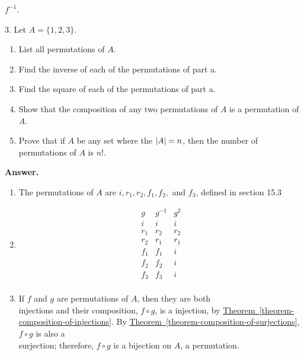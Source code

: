 \documentclass[10pt,]{book}
\theoremstyle{plain}
\theoremstyle{definition}
\theoremstyle{definition}
\theoremstyle{definition}
\begin{document}
\begin{exercisegroup}
\(f^{-1}\).%
\par\smallskip
\item[3.]\hypertarget{exercise-25}{}Let \(A = \{1, 2, 3\}\).%
\par
\leavevmode%
\begin{enumerate}[label=\alph*]
\item\hypertarget{li-78}{} List all permutations of \(A\).%
\item\hypertarget{li-79}{} Find the inverse of each of the permutations of part a.%
\item\hypertarget{li-80}{} Find the square of each of the permutations of part a.%
\item\hypertarget{li-81}{} Show that the composition of any two permutations of \(A\) is a permutation of \( A\).%
\item\hypertarget{li-82}{} Prove that if \(A\) be any set where the \(|A|=\text{\textit{$n$}}\), then the number of permutations of \(A\) is \(n!\).%
\end{enumerate}
%
\par\smallskip
\par\smallskip
\noindent\textbf{Answer.}\hypertarget{answer-12}{}\quad
\leavevmode%
\begin{enumerate}[label=\alph*]
\item\hypertarget{li-83}{} The permutations of \(A\) are \(i,r_1,r_2,f_1,f_2,\) and \(f_3\), defined in section 15.3
%
\item\hypertarget{li-84}{}    
 \[\begin{array}{ccc}
g  & g^{-1} & g^2 \\
 i & i & i \\
r_1 & r_2 & r_2  \\
r_2 & r_1 & r_1  \\
f_1 & f_1 & i \\
f_2 & f_2 & i  \\
f_3 & f_3 & i  \\
\end{array}\]%
\item\hypertarget{li-85}{}If \(f\) and \(g\) are permutations of \(A\), then they are both  \\
 injections and their composition, \(f\circ g\), is a injection, by \hyperref[theorem-composition-of-injections]{Theorem~\ref{theorem-composition-of-injections}}. By \hyperref[theorem-composition-of-surjections]{Theorem~\ref{theorem-composition-of-surjections}}, \(f\circ g\) is also a \\
 surjection; therefore, \(f\circ g\) is a bijection on \(A\), a permutation.%

\end{enumerate}
\end{exercisegroup}
\end{document}
